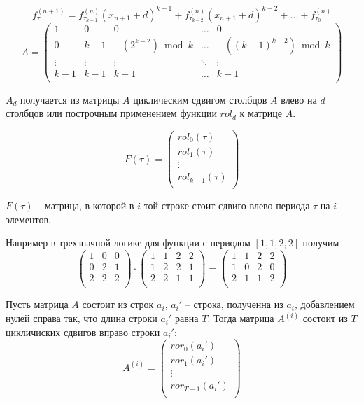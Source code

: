 \documentclass[bibliography=totoc, a4paper, 14pt]{extarticle}
\begin{document}
\begin{equation}
\label{deg}
f_{\tau}^{(n+1)} = f_{\tau_{k-1}}^{(n)}(x_{n+1}+d)^{k-1} + f_{\tau_{k-2}}^{(n)}(x_{n+1}+d)^{k-2} + \ldots + f_{\tau_{0}}^{(n)}
\end{equation}
$$
A = \begin{pmatrix}
1      & 0      & 0                  & \ldots & 0                      \\
0      & k-1    & -(2^{k-2}) \bmod k & \ldots & -((k-1)^{k-2}) \bmod k \\
\vdots & \vdots &  \vdots            & \ddots & \vdots                 \\
k-1    & k-1    & k-1                & \ldots & k-1                    \\
\end{pmatrix}
$$

$A_d$ получается из матрицы $A$ циклическим сдвигом столбцов $A$ влево на $d$ столбцов или построчным применением
функции $rol_d$ к матрице $A$.

$$
F(\tau) = \begin{pmatrix}
rol_0(\tau)     \\
rol_1(\tau)     \\
\vdots          \\
rol_{k-1}(\tau) \\
\end{pmatrix}
$$

$F(\tau)$ -- матрица, в которой в $i$-той строке стоит сдвиго влево периода $\tau$ на $i$ элементов.

Например в трехзначной логике для функции с периодом $[1,1,2,2]$ получим
$$
\begin{pmatrix}
1 & 0 & 0 \\
0 & 2 & 1 \\
2 & 2 & 2 \\
\end{pmatrix}
\cdot
\begin{pmatrix}
1 & 1 & 2 & 2 \\
1 & 2 & 2 & 1 \\
2 & 2 & 1 & 1 \\
\end{pmatrix}
=
\begin{pmatrix}
1 & 1 & 2 & 2 \\
1 & 0 & 2 & 0 \\
2 & 1 & 1 & 2 \\
\end{pmatrix}
$$

Пусть матрица $A$ состоит из строк $a_i$, $a_i'$ -- строка, полученна из $a_i$, добавлением нулей справа так, что
длина строки $a_i'$ равна $T$. Тогда матрица $A^{(i)}$ состоит из $T$ цикличиских сдвигов вправо строки $a_i'$:
$$A^{(i)} = \begin{pmatrix}
ror_0(a_i')     \\
ror_1(a_i')     \\
\vdots          \\
ror_{T-1}(a_i') \\
\end{pmatrix}
$$
\end{document}
